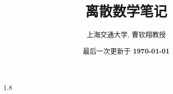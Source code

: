 \documentclass[a4paper,openany]{ctexbook}
\title{\textbf{离散数学笔记}}
\date{最后一次更新于 \textbf{\today}}
\author{上海交通大学, 曹钦翔教授}
\theoremstyle{plain}
\theoremstyle{definition}
\begin{document}
	\maketitle
	\newpage
	\thispagestyle{empty}

    
    \frontmatter
    \begin{spacing}{1.8}
        \tableofcontents
    \end{spacing}

    \mainmatter
    
    
\end{document}
